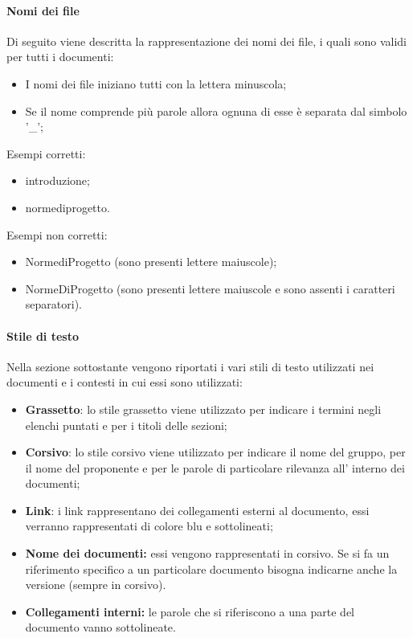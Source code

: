 \paragraph{Nomi dei file}
Di seguito viene descritta la rappresentazione dei nomi dei file, i quali sono validi per tutti i documenti:
\begin{itemize}
    \item I nomi dei file iniziano tutti con la lettera minuscola;
    \item Se il nome comprende più parole allora ognuna di esse è separata dal simbolo '\_';
\end {itemize}
Esempi corretti:
\begin{itemize}
    \item introduzione;
    \item norme\textunderscore di\textunderscore progetto.
\end {itemize}
Esempi non corretti:
\begin{itemize}
    \item Norme\textunderscore di\textunderscore Progetto (sono presenti lettere maiuscole);
    \item NormeDiProgetto (sono presenti lettere maiuscole e sono assenti i caratteri separatori).
\end {itemize}

\paragraph{Stile di testo}
Nella sezione sottostante vengono riportati i vari stili di testo utilizzati nei documenti e i contesti in cui essi sono utilizzati:
\begin {itemize}
    \item \textbf{Grassetto}: lo stile grassetto viene utilizzato per indicare i termini negli elenchi puntati e per i titoli delle sezioni;
    \item \textbf{Corsivo}: lo stile corsivo viene utilizzato per indicare il nome del gruppo, per il nome del proponente e per le parole di particolare rilevanza all' interno dei documenti;
    \item \textbf{Link}: i link rappresentano dei collegamenti esterni al documento, essi verranno rappresentati di colore blu e sottolineati;
    \item \textbf{Nome dei documenti:} essi vengono rappresentati in corsivo. Se si fa un riferimento specifico a un particolare documento bisogna indicarne anche la versione (sempre in corsivo).
    \item \textbf{Collegamenti interni:} le parole che si riferiscono a una parte del documento vanno sottolineate.
\end {itemize}
